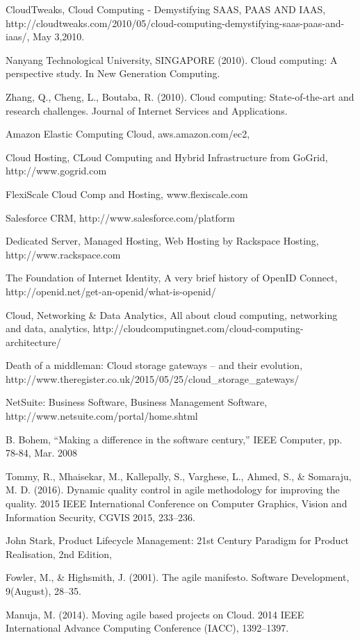 \documentclass[runningheads,a4paper]{llncs}
\begin{document}
\begin{thebibliography}{9}

  CloudTweaks,
  Cloud Computing - Demystifying SAAS, PAAS AND IAAS,
  http://cloudtweaks.com/2010/05/cloud-computing-demystifying-saas-paas-and-iaas/,
  May 3,2010.
  
Nanyang Technological University, SINGAPORE (2010). Cloud computing: A perspective study. In New Generation Computing. 

Zhang, Q., Cheng, L., Boutaba, R. (2010). Cloud computing: State-of-the-art and research challenges. Journal of Internet Services and Applications.


Amazon Elastic Computing Cloud, aws.amazon.com/ec2,

Cloud Hosting, CLoud Computing and Hybrid Infrastructure from GoGrid, http://www.gogrid.com

FlexiScale Cloud Comp and Hosting, www.flexiscale.com

Salesforce CRM, http://www.salesforce.com/platform

Dedicated Server, Managed Hosting, Web Hosting by Rackspace Hosting, http://www.rackspace.com

The Foundation of Internet Identity, A very brief history of OpenID Connect, http://openid.net/get-an-openid/what-is-openid/

Cloud, Networking \& Data Analytics,
All about cloud computing, networking and data, analytics, http://cloudcomputingnet.com/cloud-computing-architecture/

Death of a middleman: Cloud storage gateways – and their evolution, http://www.theregister.co.uk/2015/05/25/cloud\_storage\_gateways/

NetSuite: Business Software, Business Management Software, http://www.netsuite.com/portal/home.shtml

 B. Bohem, “Making a difference in the software century,” IEEE Computer, pp. 78-84, Mar. 2008
 
Tommy, R., Mhaisekar, M., Kallepally, S., Varghese, L., Ahmed, S., \& Somaraju, M. D. (2016). Dynamic quality control in agile methodology for improving the quality. 2015 IEEE International Conference on Computer Graphics, Vision and Information Security, CGVIS 2015, 233–236.

 John Stark, Product Lifecycle Management: 21st Century Paradigm for Product Realisation, 2nd Edition,
 
 Fowler, M., \& Highsmith, J. (2001). The agile manifesto. Software Development, 9(August), 28–35. 

Manuja, M. (2014). Moving agile based projects on Cloud. 2014 IEEE International Advance Computing Conference (IACC), 1392–1397. 

\end{thebibliography}



\end{document}
